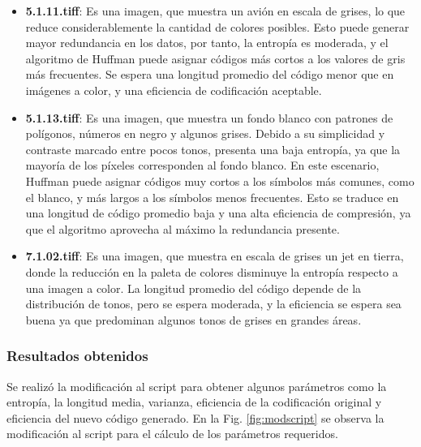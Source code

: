 \documentclass[conference,onecolumn,12pt]{IEEEtran}
\numberwithin{equation}{subsection}
\begin{document}
\begin{itemize}
    \item \textbf{5.1.11.tiff}: Es una imagen, que muestra un avión en escala de grises, lo que reduce considerablemente la cantidad de colores posibles. Esto puede generar mayor redundancia en los datos, por tanto, la entropía es moderada, y el algoritmo de Huffman puede asignar códigos más cortos a los valores de gris más frecuentes. Se espera una longitud promedio del código menor que en imágenes a color, y una eficiencia de codificación aceptable.
    \item \textbf{5.1.13.tiff}: Es una imagen, que muestra un fondo blanco con patrones de polígonos, números en negro y algunos grises. Debido a su simplicidad y contraste marcado entre pocos tonos, presenta una baja entropía, ya que la mayoría de los píxeles corresponden al fondo blanco. En este escenario, Huffman puede asignar códigos muy cortos a los símbolos más comunes, como el blanco, y más largos a los símbolos menos frecuentes. Esto se traduce en una longitud de código promedio baja y una alta eficiencia de compresión, ya que el algoritmo aprovecha al máximo la redundancia presente.
    \item \textbf{7.1.02.tiff}: Es una imagen, que muestra en escala de grises un jet en tierra, donde la reducción en la paleta de colores disminuye la entropía respecto a una imagen a color. La longitud promedio del código depende de la distribución de tonos, pero se espera moderada, y la eficiencia se espera sea buena ya que predominan algunos tonos de grises en grandes áreas.
\end{itemize}

\subsubsection{Resultados obtenidos}

Se realizó la modificación al script para obtener algunos parámetros como la entropía, la longitud media, varianza, eficiencia de la codificación original y eficiencia del nuevo código generado. En la Fig. \ref{fig:modscript} se observa la modificación al script para el cálculo de los parámetros requeridos.
\end{document}
